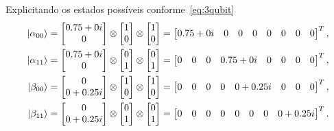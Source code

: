Explicitando os estados possíveis conforme~\eqref{eq:3qubit}
\begin{equation}
  \begin{split}
    \ket{\alpha_{00}} &= \begin{bmatrix} {0.75+0i} \\ 0 \end{bmatrix} \otimes
                     \begin{bmatrix} 1 \\ 0 \end{bmatrix} \otimes
                     \begin{bmatrix} 1 \\ 0 \end{bmatrix} =
                     \begin{bmatrix} {0.75+0i} & 0 & 0 & 0 & 0 & 0 & 0 & 0 \end{bmatrix}^T, \\
    \ket{\alpha_{11}} &= \begin{bmatrix} {0.75+0i} \\ 0 \end{bmatrix} \otimes
                        \begin{bmatrix} 0 \\ 1 \end{bmatrix} \otimes
                        \begin{bmatrix} 0 \\ 1 \end{bmatrix} =
                        \begin{bmatrix} 0 & 0 & 0 & {0.75+0i} & 0 & 0 & 0 & 0 \end{bmatrix}^T, \\
    \ket{\beta_{00}} &= \begin{bmatrix} 0 \\ {0+0.25i} \end{bmatrix} \otimes
                    \begin{bmatrix} 1 \\ 0 \end{bmatrix} \otimes
                    \begin{bmatrix} 1 \\ 0 \end{bmatrix} =
                    \begin{bmatrix} 0 & 0 & 0 & 0 & {0+0.25i} & 0 & 0 & 0 \end{bmatrix}^T, \\
    \ket{\beta_{11}} &= \begin{bmatrix} 0 \\ {0+0.25i} \end{bmatrix} \otimes
                       \begin{bmatrix} 0 \\ 1 \end{bmatrix} \otimes
                       \begin{bmatrix} 0 \\ 1 \end{bmatrix} =
                       \begin{bmatrix} 0 & 0 & 0 & 0 & 0 & 0 & 0 & {0+0.25i} \end{bmatrix}^T.
  \end{split}
\end{equation}
